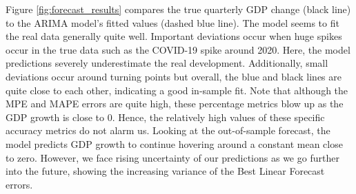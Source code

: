 \documentclass[
]{article}
\begin{document}
Figure \ref{fig:forecast_results} compares the true quarterly GDP change (black line) to the 
ARIMA model’s fitted values (dashed blue line). The model seems to fit the real 
data generally quite well. Important deviations occur when huge spikes occur in 
the true data such as the COVID-19 spike around 2020. Here, the model predictions 
severely underestimate the real development. Additionally, small deviations occur 
around turning points but overall, the blue and black lines are quite close to each 
other, indicating a good in-sample fit. Note that although the MPE and MAPE errors 
are quite high, these percentage metrics blow up as the GDP growth is close to 0. 
Hence, the relatively high values of these specific accuracy metrics do not alarm us.
Looking at the out-of-sample forecast, the model predicts GDP growth to continue 
hovering around a constant mean close to zero. However, we face rising uncertainty 
of our predictions as we go further into the future, showing the increasing 
variance of the Best Linear Forecast errors.
\end{document}
